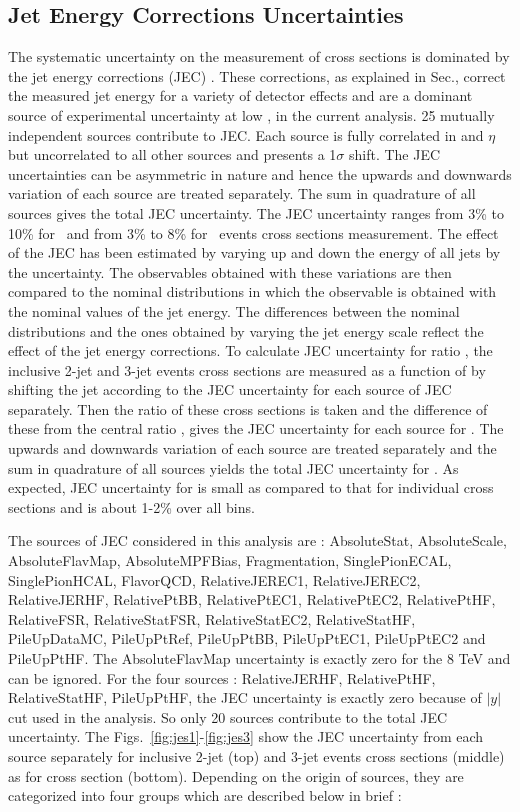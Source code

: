 \subsection{Jet Energy Corrections Uncertainties}
The systematic uncertainty on the measurement of cross sections is dominated by the jet energy corrections (JEC) \cite{Khachatryan:2016kdb}. These corrections, as explained in Sec.\qm, correct the measured jet energy for a variety of detector effects and are a dominant source of experimental uncertainty at low \httwo, in the current analysis. 25 mutually independent sources contribute to JEC. Each source is fully correlated in \pt and $\eta$ but uncorrelated to all other sources and presents a 1$\sigma$ shift. The JEC uncertainties can be asymmetric in nature and hence the upwards and downwards variation of each source are treated separately. The sum in quadrature of all sources gives the total JEC uncertainty. The JEC uncertainty ranges from 3\% to 10\% for \njt~and from 3\% to 8\% for \njth~events cross sections measurement. The effect of the JEC has been estimated by varying up and down the energy of all jets by the uncertainty. The observables obtained with these variations are then compared to the nominal distributions in which the observable is obtained with the nominal values of the jet energy. The differences between the nominal distributions and the ones obtained by varying the jet energy scale reflect the effect of the jet energy corrections. To calculate JEC uncertainty for ratio \ratio, the inclusive 2-jet and 3-jet events cross sections are measured as a function of \httwo by shifting the jet \pt according to the JEC uncertainty for each source of JEC separately. Then the ratio of these cross sections is taken and the difference of these from the central ratio \ratio, gives the JEC uncertainty for each source for \ratio. The upwards and downwards variation of each source are treated separately and the sum in quadrature of all sources yields the total JEC uncertainty for \ratio. As expected, JEC uncertainty for \ratio is small as compared to that for individual cross sections and is about 1-2\% over all \httwo bins.

 The sources of JEC considered in this analysis are : AbsoluteStat, AbsoluteScale, AbsoluteFlavMap, AbsoluteMPFBias, Fragmentation, SinglePionECAL, SinglePionHCAL, FlavorQCD, RelativeJEREC1, RelativeJEREC2, RelativeJERHF, RelativePtBB, RelativePtEC1, RelativePtEC2, RelativePtHF, RelativeFSR, RelativeStatFSR, RelativeStatEC2, RelativeStatHF, PileUpDataMC, PileUpPtRef, PileUpPtBB, PileUpPtEC1, PileUpPtEC2 and PileUpPtHF. The AbsoluteFlavMap uncertainty is exactly zero for the 8 TeV and can be ignored. For the four sources : RelativeJERHF, RelativePtHF, RelativeStatHF, PileUpPtHF, the JEC uncertainty is exactly zero because of $|y|$  cut used in the analysis. So only 20 sources contribute to the total JEC uncertainty. The Figs.~\ref{fig:jes1}-\ref{fig:jes3} show the JEC uncertainty from each source separately for inclusive 2-jet (top) and 3-jet events cross sections (middle) as for cross section \ratio (bottom). Depending on the origin of sources, they are categorized into four groups which are described below in brief :

